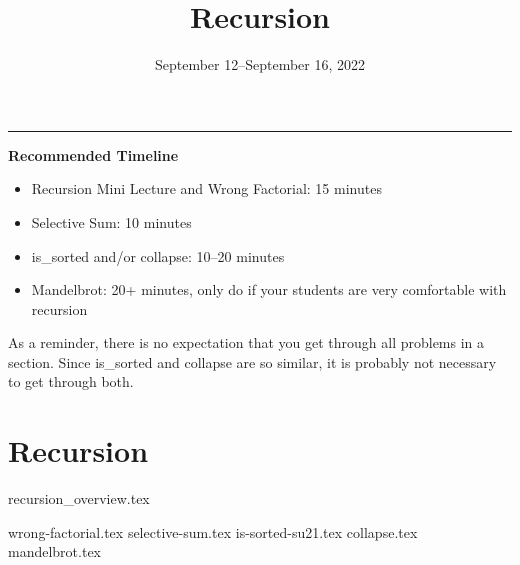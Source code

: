 \documentclass{exam}
\title{Recursion}
\date{September 12--September 16, 2022}
\begin{document}
\maketitle
\rule{\textwidth}{0.15em}
\fontsize{12}{15}\selectfont

\begin{meta}
\textbf{Recommended Timeline}
\begin{itemize}
    \item Recursion Mini Lecture and Wrong Factorial: 15 minutes
    \item Selective Sum: 10 minutes
    \item is\_sorted and/or collapse: 10--20 minutes
    \item Mandelbrot: 20+ minutes, only do if your students are very comfortable with recursion
\end{itemize}
As a reminder, there is no expectation that you get through all problems in a section. Since is\_sorted and collapse are so similar, it is probably not necessary to get through both. 
\end{meta}

\section{Recursion}
{recursion_overview.tex}
\begin{questions}
    {wrong-factorial.tex}
    {selective-sum.tex}
    {is-sorted-su21.tex}
    {collapse.tex}
    {mandelbrot.tex}
\end{questions}
\end{document}
